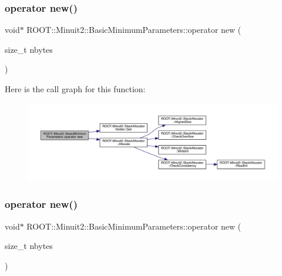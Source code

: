 \subsubsection{\texorpdfstring{operator new()}{operator new()}\hspace{0.1cm}{\footnotesize\ttfamily [1/3]}}
{\footnotesize\ttfamily void$\ast$ R\+O\+O\+T\+::\+Minuit2\+::\+Basic\+Minimum\+Parameters\+::operator new (\begin{DoxyParamCaption}\item[{size\+\_\+t}]{nbytes }\end{DoxyParamCaption})\hspace{0.3cm}{\ttfamily [inline]}}

Here is the call graph for this function\+:
\nopagebreak
\begin{figure}[H]
\begin{center}
\leavevmode
\includegraphics[width=350pt]{da/d30/classROOT_1_1Minuit2_1_1BasicMinimumParameters_a5258a9959c0b6ff699a9200dad4caee0_cgraph}
\end{center}
\end{figure}
\mbox{\label{classROOT_1_1Minuit2_1_1BasicMinimumParameters_a5258a9959c0b6ff699a9200dad4caee0}} 
\subsubsection{\texorpdfstring{operator new()}{operator new()}\hspace{0.1cm}{\footnotesize\ttfamily [2/3]}}
{\footnotesize\ttfamily void$\ast$ R\+O\+O\+T\+::\+Minuit2\+::\+Basic\+Minimum\+Parameters\+::operator new (\begin{DoxyParamCaption}\item[{size\+\_\+t}]{nbytes }\end{DoxyParamCaption})\hspace{0.3cm}{\ttfamily [inline]}}

